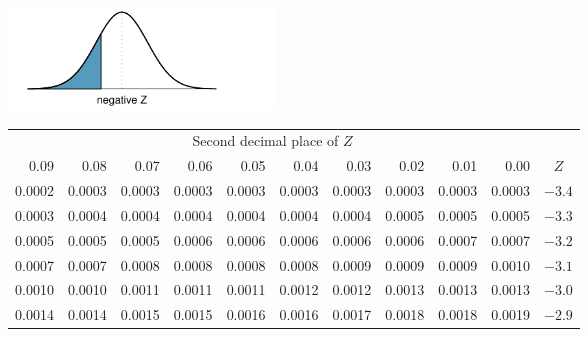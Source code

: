 \begin{table}[p]
\begin{center}{\small
\includegraphics[width=71mm]{extraTeX/tables/figures/normalTails/normalTailLeft} \vspace{2mm} \\
\begin{tabular}{| rrrrr | rrrrr | c}
  \cline{1-10}
&&& \multicolumn{4}{c}{Second decimal place of $Z$} &&& \\
  \cline{1-10}
0.09 &  0.08 &  0.07 &  0.06 &  0.05 &  0.04 &  0.03 &  0.02 &  0.01 &  0.00 & $Z$  \\
  \hline
  \hline
\footnotesize{0.0002} & \footnotesize{0.0003} & \footnotesize{0.0003} & \footnotesize{0.0003} & \footnotesize{0.0003} & \footnotesize{0.0003} & \footnotesize{0.0003} & \footnotesize{0.0003} & \footnotesize{0.0003} & \footnotesize{0.0003} & $-3.4$ \\
  \footnotesize{0.0003} & \footnotesize{0.0004} & \footnotesize{0.0004} & \footnotesize{0.0004} & \footnotesize{0.0004} & \footnotesize{0.0004} & \footnotesize{0.0004} & \footnotesize{0.0005} & \footnotesize{0.0005} & \footnotesize{0.0005} & $-3.3$ \\
  \footnotesize{0.0005} & \footnotesize{0.0005} & \footnotesize{0.0005} & \footnotesize{0.0006} & \footnotesize{0.0006} & \footnotesize{0.0006} & \footnotesize{0.0006} & \footnotesize{0.0006} & \footnotesize{0.0007} & \footnotesize{0.0007} & $-3.2$ \\
  \footnotesize{0.0007} & \footnotesize{0.0007} & \footnotesize{0.0008} & \footnotesize{0.0008} & \footnotesize{0.0008} & \footnotesize{0.0008} & \footnotesize{0.0009} & \footnotesize{0.0009} & \footnotesize{0.0009} & \footnotesize{0.0010} & $-3.1$ \\
  \footnotesize{0.0010} & \footnotesize{0.0010} & \footnotesize{0.0011} & \footnotesize{0.0011} & \footnotesize{0.0011} & \footnotesize{0.0012} & \footnotesize{0.0012} & \footnotesize{0.0013} & \footnotesize{0.0013} & \footnotesize{0.0013} & $-3.0$ \\
    \hline
    \hline
  \footnotesize{0.0014} & \footnotesize{0.0014} & \footnotesize{0.0015} & \footnotesize{0.0015} & \footnotesize{0.0016} & \footnotesize{0.0016} & \footnotesize{0.0017} & \footnotesize{0.0018} & \footnotesize{0.0018} & \footnotesize{0.0019} & $-2.9$ \\

\end{tabular}}
\end{center}
\end{table}
